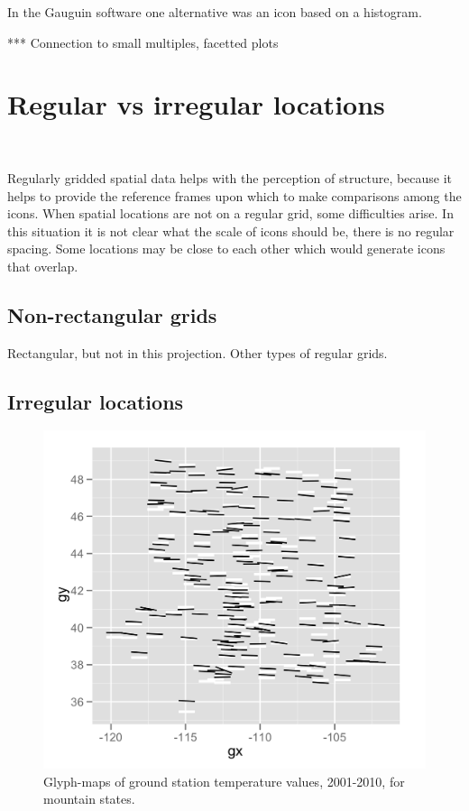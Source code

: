 \documentclass[oneside]{article}
\begin{document}
In the Gauguin software one alternative was an icon based on a histogram. 

*** Connection to small multiples, facetted plots

\section{Regular vs irregular locations}~\label{sec:irregular}

Regularly gridded spatial data helps with the perception of structure, because it helps to provide the reference frames upon which to make comparisons among the icons. When spatial locations are not on a regular grid, some difficulties arise. In this situation it is not clear what the scale of icons should be, there is no regular spacing. Some locations may be close to each other which would generate icons that overlap. 

\subsection{Non-rectangular grids}

Rectangular, but not in this projection.  Other types of regular grids.

\subsection{Irregular locations}

\begin{figure}[htbp]
  \centering
  \includegraphics[width=0.8\linewidth]{ghcn-mountains}%
  \caption{Glyph-maps of ground station temperature values, 2001-2010, for mountain states.}
  \label{fig:irregular}
\end{figure}
\end{document}

